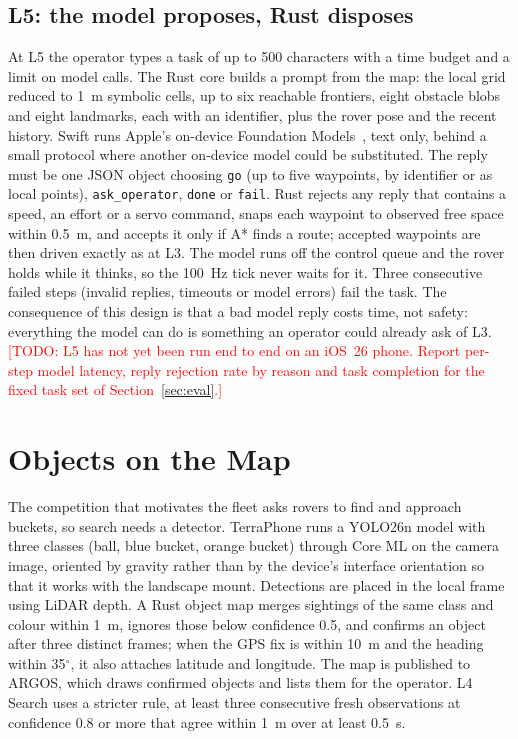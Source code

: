 \documentclass[conference]{IEEEtran}
\newcommand{\todo}[1]{\textcolor{red}{[TODO: #1]}}
\begin{document}
\subsection{L5: the model proposes, Rust disposes}
At L5 the operator types a task of up to 500 characters with a time budget and a limit on model calls.
The Rust core builds a prompt from the map: the local grid reduced to 1~m symbolic cells, up to six reachable frontiers, eight obstacle blobs and eight landmarks, each with an identifier, plus the rover pose and the recent history.
Swift runs Apple's on-device Foundation Models~\cite{apple2026foundationmodels}, text only, behind a small protocol where another on-device model could be substituted.
The reply must be one JSON object choosing \texttt{go} (up to five waypoints, by identifier or as local points), \texttt{ask\_operator}, \texttt{done} or \texttt{fail}.
Rust rejects any reply that contains a speed, an effort or a servo command, snaps each waypoint to observed free space within 0.5~m, and accepts it only if A* finds a route; accepted waypoints are then driven exactly as at L3.
The model runs off the control queue and the rover holds while it thinks, so the 100~Hz tick never waits for it.
Three consecutive failed steps (invalid replies, timeouts or model errors) fail the task.
The consequence of this design is that a bad model reply costs time, not safety: everything the model can do is something an operator could already ask of L3.
\todo{L5 has not yet been run end to end on an iOS~26 phone. Report per-step model latency, reply rejection rate by reason and task completion for the fixed task set of Section~\ref{sec:eval}.}

\section{Objects on the Map}
\label{sec:objects}

The competition that motivates the fleet asks rovers to find and approach buckets, so search needs a detector.
TerraPhone runs a YOLO26n model with three classes (ball, blue bucket, orange bucket) through Core ML on the camera image, oriented by gravity rather than by the device's interface orientation so that it works with the landscape mount.
Detections are placed in the local frame using LiDAR depth.
A Rust object map merges sightings of the same class and colour within 1~m, ignores those below confidence 0.5, and confirms an object after three distinct frames; when the GPS fix is within 10~m and the heading within 35$^\circ$, it also attaches latitude and longitude.
The map is published to ARGOS, which draws confirmed objects and lists them for the operator.
L4 Search uses a stricter rule, at least three consecutive fresh observations at confidence 0.8 or more that agree within 1~m over at least 0.5~s.
\end{document}
